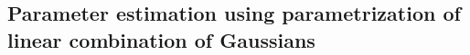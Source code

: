 \documentclass{scrartcl}[12pt, halfparskip]
\numberwithin{equation}{section}
\numberwithin{figure}{section}
\numberwithin{table}{section}
\begin{document}
\subsection{Parameter estimation using parametrization of linear combination of Gaussians}

\end{document}
